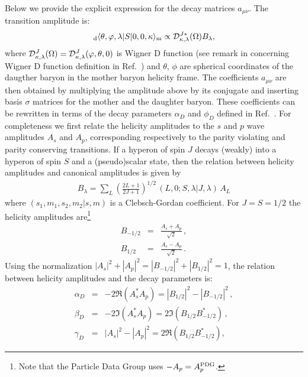 Below we provide the explicit expression for the decay matrices
$a_{\mu\nu}$. The transition amplitude is:
\begin{equation}
{}_{\rm d}\langle \theta, \varphi, \lambda\vert S \vert 0,0,\kappa\rangle
_{\rm m}
\propto {\cal D}^{J *}_{\kappa,\lambda}(\Omega) B_{\lambda},
\label{eqn:amphdecay}
\end{equation}
where ${\cal D}^{J }_{\kappa,\lambda}(\Omega)={\cal D}^{J }_{\kappa,\lambda}(\varphi,\theta,0)$ is Wigner D function (see remark in concerning Wigner D function definition in Ref.~\cite{Perotti:2018wxm}) and $\theta$, $\phi$
are spherical coordinates of the daugther baryon in the mother baryon helicity frame.
The coefficients  $a_{\mu\nu}$ are then obtained by multiplying the amplitude above
by its conjugate and inserting basis $\sigma$ matrices for the mother 
and the daughter baryon.
These coefficients can be rewritten  in terms of the 
decay parameters $\alpha_D$ and $\phi_D$ defined in Ref.~\cite{PDG18}. For completeness 
we first relate the helicity amplitudes to the $s$ and $p$
wave amplitudes $A_s$ and $A_p$, corresponding respectively to the 
parity violating and parity conserving transitions. 
If a hyperon of spin $J$ decays (weakly) into a hyperon of spin $S$ and a (pseudo)scalar state, then the relation between 
helicity amplitudes and canonical amplitudes is given by \cite{Jacob:1959at}
\begin{eqnarray}
  \label{eq:hel-LS}
  B_\lambda = \sum\limits_L \left(\frac{2L+1}{2J+1}\right)^{1/2} \, (L,0;S,\lambda\vert J,\lambda) \, A_L 
\end{eqnarray}
where $(s_1,m_1,s_2,m_2\vert s, m)$ is a Clebsch-Gordan coefficient.
For $J=S=1/2$ the helicity amplitudes are\footnote{Note that the Particle Data Group \cite{PDG18} uses $-A_p=A_p^{\rm PDG}$.} 
\begin{eqnarray}
B_{-1/2}&=&\frac{A_s+A_p}{\sqrt{2}} \,, \nonumber \\
B_{1/2}&=&\frac{A_s-A_p}{\sqrt{2}} \,.
\label{eqn:JWdec}
\end{eqnarray} 
Using the normalization $|A_s|^2+|A_p|^2=|B_{-1/2}|^2+|B_{1/2}|^2=1$,
the relation between helicity amplitudes and the decay parameters
is:
\begin{eqnarray}
\alpha_D&=&-2\Re(A_s^*A_p)=|B_{1/2}|^2-|B_{-1/2}|^2  \,, \nonumber\\
\beta_D&=&-2\Im(A_s^*A_p)=2\Im(B_{1/2}B_{-1/2}^*)  \,,\label{eqn:dparam} \\
\gamma_D&=&|A_s|^2-|A_p|^2=2\Re(B_{1/2}B_{-1/2}^*),\nonumber   
\end{eqnarray}
